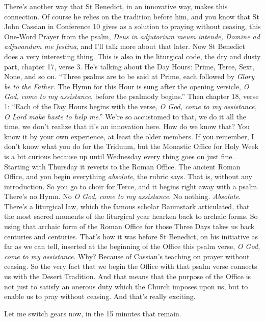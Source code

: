 There's another way that St Benedict, in an innovative way, makes this connection. Of course he relies on the tradition before him, and you know that St John Cassian in Conference 10 gives as a solution to praying without ceasing, this One-Word Prayer from the psalm, \emph{Deus in adjutorium meum intende, Domine ad adjuvandum me festina}, and I'll talk more about that later. Now St Benedict does a very interesting thing. This is also in the liturgical code, the dry and dusty part, chapter 17, verse 3. He's talking about the Day Hours: Prime, Terce, Sext, None, and so on. ``Three psalms are to be said at Prime, each followed by \emph{Glory be to the Father}. The Hymn for this Hour is sung after the opening versicle, \emph{O God, come to my assistance}, before the psalmody begins.'' Then chapter 18, verse 1: ``Each of the Day Hours begins with the verse, \emph{O God, come to my assistance, O Lord make haste to help me}.'' We're so accustomed to that, we do it all the time, we don't realize that it's an innovation here. How do we know that? You know it by your own experience, at least the older members. If you remember, I don't know what you do for the Triduum, but the Monastic Office for Holy Week is a bit curious because up until Wednesday every thing goes on just fine. Starting with Thursday it reverts to the Roman Office. The ancient Roman Office, and you begin everything \emph{absolute}, the rubric says. That is, without any introduction. So you go to choir for Terce, and it begins right away with a psalm. There's no Hymn. No \emph{O God, come to my assistance}. No nothing. \emph{Absolute}. There's a liturgical law, which the famous scholar Baumstark articulated, that the most sacred moments of the liturgical year hearken back to archaic forms. So using that archaic form of the Roman Office for those Three Days takes us back centuries and centuries. That's how it was before St Benedict, on his initiative as far as we can tell, inserted at the beginning of the Office this psalm verse, \emph{O God, come to my assistance}. Why? Because of Cassian's teaching on prayer without ceasing. So the very fact that we begin the Office with that psalm verse connects us with the Desert Tradition. And that means that the purpose of the Office is not just to satisfy an onerous duty which the Church imposes upon us, but to enable us to pray without ceasing. And that's really exciting.

Let me switch gears now, in the 15 minutes that remain.






